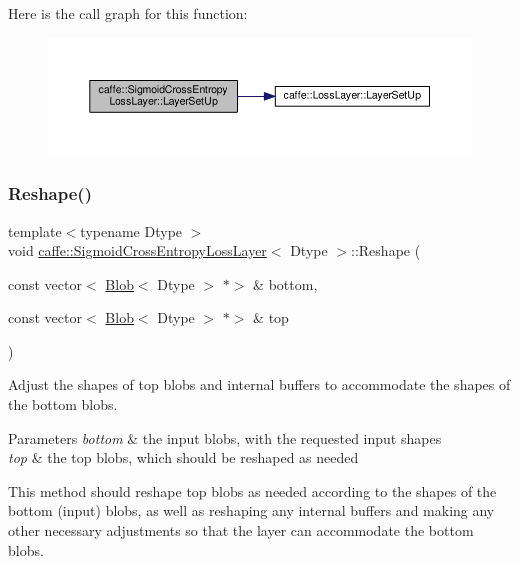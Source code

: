 Here is the call graph for this function\+:
\nopagebreak
\begin{figure}[H]
\begin{center}
\leavevmode
\includegraphics[width=350pt]{classcaffe_1_1_sigmoid_cross_entropy_loss_layer_aa1535140dd4eb94557c3afc89076d56d_cgraph}
\end{center}
\end{figure}
\mbox{\label{classcaffe_1_1_sigmoid_cross_entropy_loss_layer_a305423abeea4bd1652ff7e696aaba808}} 
\subsubsection{\texorpdfstring{Reshape()}{Reshape()}\hspace{0.1cm}{\footnotesize\ttfamily [1/2]}}
{\footnotesize\ttfamily template$<$typename Dtype $>$ \\
void \mbox{\hyperlink{classcaffe_1_1_sigmoid_cross_entropy_loss_layer}{caffe\+::\+Sigmoid\+Cross\+Entropy\+Loss\+Layer}}$<$ Dtype $>$\+::Reshape (\begin{DoxyParamCaption}\item[{const vector$<$ \mbox{\hyperlink{classcaffe_1_1_blob}{Blob}}$<$ Dtype $>$ $\ast$$>$ \&}]{bottom,  }\item[{const vector$<$ \mbox{\hyperlink{classcaffe_1_1_blob}{Blob}}$<$ Dtype $>$ $\ast$$>$ \&}]{top }\end{DoxyParamCaption})\hspace{0.3cm}{\ttfamily [virtual]}}



Adjust the shapes of top blobs and internal buffers to accommodate the shapes of the bottom blobs. 


\begin{DoxyParams}{Parameters}
{\em bottom} & the input blobs, with the requested input shapes \\
\hline
{\em top} & the top blobs, which should be reshaped as needed\\
\hline
\end{DoxyParams}
This method should reshape top blobs as needed according to the shapes of the bottom (input) blobs, as well as reshaping any internal buffers and making any other necessary adjustments so that the layer can accommodate the bottom blobs. 

